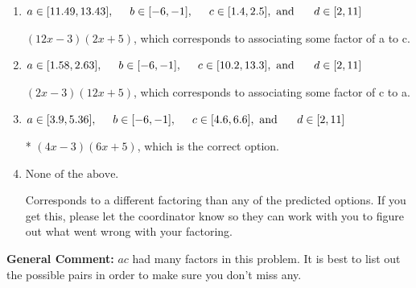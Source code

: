 \documentclass{extbook}[14pt]
\begin{document}
\begin{enumerate}
{\begin{enumerate}[label=\Alph*.]
 $(x -18)(x + 20)$, which corresponds to factoring $x^{2} +2 x -360$.
\item \( a \in [11.49, 13.43], \hspace*{5mm} b \in [-6, -1], \hspace*{5mm} c \in [1.4, 2.5], \text{ and } \hspace*{5mm} d \in [2, 11] \)

 $(12x -3)(2x + 5)$, which corresponds to associating some factor of a to c.
\item \( a \in [1.58, 2.63], \hspace*{5mm} b \in [-6, -1], \hspace*{5mm} c \in [10.2, 13.3], \text{ and } \hspace*{5mm} d \in [2, 11] \)

 $(2x -3)(12x + 5)$, which corresponds to associating some factor of c to a.
\item \( a \in [3.9, 5.36], \hspace*{5mm} b \in [-6, -1], \hspace*{5mm} c \in [4.6, 6.6], \text{ and } \hspace*{5mm} d \in [2, 11] \)

* $(4x -3)(6x + 5)$, which is the correct option.
\item \( \text{None of the above.} \)

 Corresponds to a different factoring than any of the predicted options. If you get this, please let the coordinator know so they can work with you to figure out what went wrong with your factoring.
\end{enumerate}

\textbf{General Comment:} $ac$ had many factors in this problem. It is best to list out the possible pairs in order to make sure you don't miss any.
}
\end{enumerate}
\end{document}
